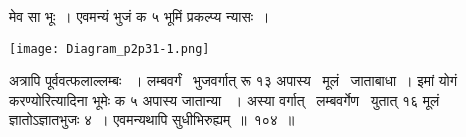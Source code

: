 \documentclass[11pt, openany]{book}
\begin{document}
\begin{sloppypar}
\noindent मेव सा भूः~। एवमन्यं भुजं क ५ भूमिं प्रकल्प्य न्यासः~।

\begin{center}
\texttt{[image: Diagram\_p2p31-1.png]}
\end{center}

\noindent अत्रापि पूर्ववत्फलाल्लम्बः ~। लम्बवर्गं \, भुजवर्गात् रू १३ अपास्य \, मूलं \, जाताबाधा~। इमां योगं करण्योरित्यादिना भूमेः क ५ अपास्य जातान्या ~। अस्या वर्गात् \, लम्बवर्गेण \, युतात् १६ मूलं ज्ञातोऽज्ञातभुजः ४~। एवमन्यथापि सुधीभिरुह्यम्~॥~१०४~॥\\


\end{sloppypar}
\end{document}
